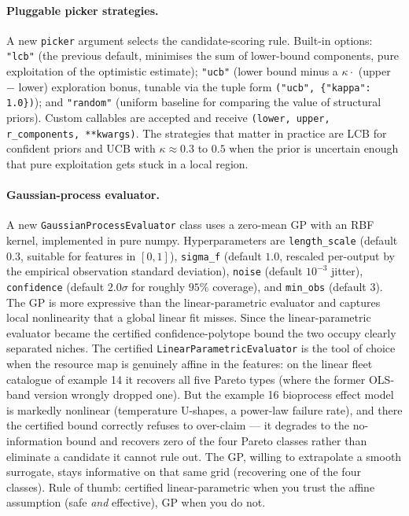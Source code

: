\documentclass[11pt,a4paper]{article}
\begin{document}
\paragraph{Pluggable picker strategies.} A new \texttt{picker}
argument selects the candidate-scoring rule. Built-in options:
\texttt{"lcb"} (the previous default, minimises the sum of
lower-bound components, pure exploitation of the optimistic
estimate); \texttt{"ucb"} (lower bound minus a $\kappa \cdot$
(upper $-$ lower) exploration bonus, tunable via the tuple form
\texttt{("ucb", \{"kappa": 1.0\})}); and \texttt{"random"}
(uniform baseline for comparing the value of structural priors).
Custom callables are accepted and receive
\texttt{(lower, upper, r\_components, **kwargs)}. The strategies
that matter in practice are LCB for confident priors and UCB with
$\kappa \approx 0.3$ to $0.5$ when the prior is uncertain enough
that pure exploitation gets stuck in a local region.

\paragraph{Gaussian-process evaluator.} A new
\texttt{GaussianProcessEvaluator} class uses a zero-mean GP with
an RBF kernel, implemented in pure numpy. Hyperparameters are
\texttt{length\_scale} (default $0.3$, suitable for features in
$[0, 1]$), \texttt{sigma\_f} (default $1.0$, rescaled per-output by
the empirical observation standard deviation), \texttt{noise}
(default $10^{-3}$ jitter), \texttt{confidence} (default $2.0\sigma$
for roughly $95\%$ coverage), and \texttt{min\_obs} (default $3$).
The GP is more expressive than the linear-parametric evaluator and
captures local nonlinearity that a global linear fit misses. Since the
linear-parametric evaluator became the certified confidence-polytope
bound the two occupy clearly separated niches. The certified
\texttt{LinearParametricEvaluator} is the tool of choice when the
resource map is genuinely affine in the features: on the linear fleet
catalogue of example 14 it recovers all five Pareto types (where the
former OLS-band version wrongly dropped one). But the example 16
bioprocess effect model is markedly nonlinear (temperature U-shapes,
a power-law failure rate), and there the certified bound correctly
refuses to over-claim --- it degrades to the no-information bound and
recovers zero of the four Pareto classes rather than eliminate a
candidate it cannot rule out. The GP, willing to extrapolate a smooth
surrogate, stays informative on that same grid (recovering one of the
four classes). Rule of thumb: certified linear-parametric when you
trust the affine assumption (safe \emph{and} effective), GP when you
do not.
\end{document}
